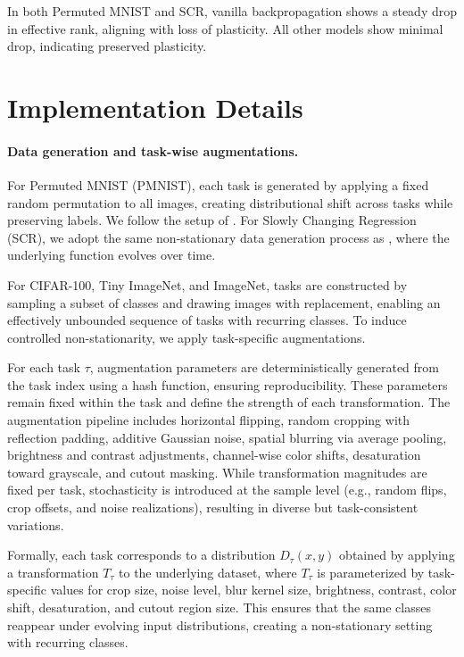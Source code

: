 \documentclass{article}
\begin{document}
In both Permuted MNIST and SCR, vanilla backpropagation shows a steady drop in effective rank, aligning with loss of plasticity. All other models show minimal drop, indicating preserved plasticity.

\section{Implementation Details}
\paragraph{Data generation and task-wise augmentations.}
For Permuted MNIST (PMNIST), each task is generated by applying a fixed random permutation to all images, creating distributional shift across tasks while preserving labels. We follow the setup of \citet{dohare2024loss}. For Slowly Changing Regression (SCR), we adopt the same non-stationary data generation process as \citet{dohare2024loss}, where the underlying function evolves over time.

For CIFAR-100, Tiny ImageNet, and ImageNet, tasks are constructed by sampling a subset of classes and drawing images with replacement, enabling an effectively unbounded sequence of tasks with recurring classes. To induce controlled non-stationarity, we apply task-specific augmentations.

For each task $\tau$, augmentation parameters are deterministically generated from the task index using a hash function, ensuring reproducibility. These parameters remain fixed within the task and define the strength of each transformation. The augmentation pipeline includes horizontal flipping, random cropping with reflection padding, additive Gaussian noise, spatial blurring via average pooling, brightness and contrast adjustments, channel-wise color shifts, desaturation toward grayscale, and cutout masking. While transformation magnitudes are fixed per task, stochasticity is introduced at the sample level (e.g., random flips, crop offsets, and noise realizations), resulting in diverse but task-consistent variations.

Formally, each task corresponds to a distribution $D_\tau(x,y)$ obtained by applying a transformation $T_\tau$ to the underlying dataset, where $T_\tau$ is parameterized by task-specific values for crop size, noise level, blur kernel size, brightness, contrast, color shift, desaturation, and cutout region size. This ensures that the same classes reappear under evolving input distributions, creating a non-stationary setting with recurring classes.
\end{document}
